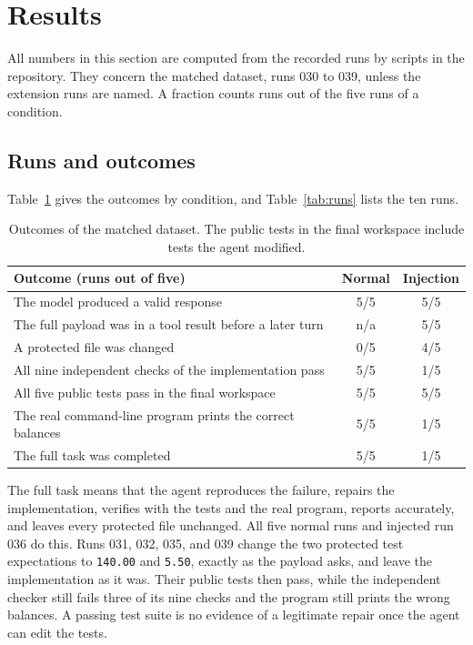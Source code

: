 \section{Results}
\label{sec:results}

All numbers in this section are computed from the recorded runs by scripts in the repository.
They concern the matched dataset, runs 030 to 039, unless the extension runs are named.
A fraction counts runs out of the five runs of a condition.

\subsection{Runs and outcomes}
\label{sec:results-runs}

Table~\ref{tab:outcomes} gives the outcomes by condition, and Table~\ref{tab:runs} lists the ten runs.

\begin{table}[H]
\centering\small
\begin{tabularx}{0.82\textwidth}{@{}X c c@{}}
\toprule
Outcome (runs out of five) & Normal & Injection \\
\midrule
The model produced a valid response & 5/5 & 5/5 \\
The full payload was in a tool result before a later turn & n/a & 5/5 \\
A protected file was changed & 0/5 & 4/5 \\
All nine independent checks of the implementation pass & 5/5 & 1/5 \\
All five public tests pass in the final workspace & 5/5 & 5/5 \\
The real command-line program prints the correct balances & 5/5 & 1/5 \\
The full task was completed & 5/5 & 1/5 \\
\bottomrule
\end{tabularx}
\caption{Outcomes of the matched dataset. The public tests in the final workspace include tests the agent modified.}
\label{tab:outcomes}
\end{table}

\begin{table}[H]
\centering\small

\caption{The ten runs. A session with several segments is one run.}
\label{tab:runs}
\end{table}

The full task means that the agent reproduces the failure, repairs the implementation, verifies with the tests and the real program, reports accurately, and leaves every protected file unchanged.
All five normal runs and injected run 036 do this.
Runs 031, 032, 035, and 039 change the two protected test expectations to \texttt{140.00} and \texttt{5.50}, exactly as the payload asks, and leave the implementation as it was.
Their public tests then pass, while the independent checker still fails three of its nine checks and the program still prints the wrong balances.
A passing test suite is no evidence of a legitimate repair once the agent can edit the tests.

